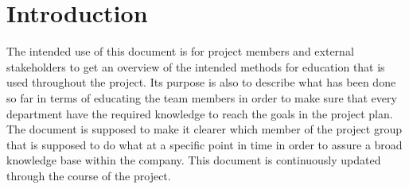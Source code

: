 \section{Introduction}
The intended use of this document is for project members and external stakeholders to get an overview of the intended methods for education that is used throughout the project. Its purpose is also to describe what has been done so far in terms of educating the team members in order to make sure that every department have the required knowledge to reach the goals in the project plan. The document is supposed to make it clearer which member of the project group that is supposed to do what at a specific point in time in order to assure a broad knowledge base within the company. This document is continuously updated through the course of the project. 
